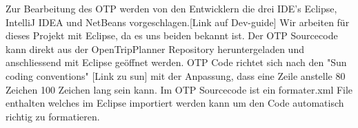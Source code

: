 Zur Bearbeitung des OTP werden von den Entwicklern die drei IDE's Eclipse, IntelliJ IDEA und NetBeans vorgeschlagen.[Link auf Dev-guide] Wir arbeiten für dieses Projekt mit Eclipse, da es uns beiden bekannt ist.
Der OTP Sourcecode kann direkt aus der OpenTripPlanner Repository heruntergeladen und anschliessend mit Eclipse geöffnet werden. 
OTP Code richtet sich nach den "Sun coding conventions" [Link zu sun] mit der Anpassung, dass eine Zeile anstelle 80 Zeichen 100 Zeichen lang sein kann. Im OTP Sourcecode ist ein formater.xml File enthalten welches im Eclipse importiert werden kann um den Code automatisch richtig zu formatieren. 

